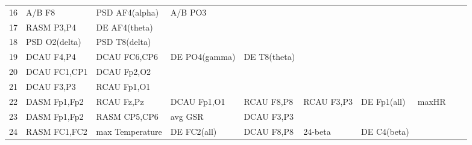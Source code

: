 \begin{landscape}
\begin{table}[]
\begin{tabular}{l|llllllll}
16       & A/B F8                & PSD AF4(alpha)        & A/B PO3              &                         &                         &                      &                      &                       &                       &                    \\
17       & RASM P3,P4            & DE AF4(theta)         &                      &                         &                         &                      &                      &                       &                       &                    \\
18       & PSD O2(delta)         & PSD T8(delta)         &                      &                         &                         &                      &                      &                       &                       &                    \\
19       & DCAU F4,P4            & DCAU FC6,CP6          & DE PO4(gamma)        & DE T8(theta)            &                         &                      &                      &                       &                       &                    \\
20       & DCAU FC1,CP1          & DCAU Fp2,O2           &                      &                         &                         &                      &                      &                       &                       &                    \\
21       & DCAU F3,P3            & RCAU Fp1,O1           &                      &                         &                         &                      &                      &                       &                       &                    \\
22       & DASM Fp1,Fp2          & RCAU Fz,Pz            & DCAU Fp1,O1          & RCAU F8,P8              & RCAU F3,P3              & DE Fp1(all)          & maxHR                &                       &                       &                    \\
23       & DASM Fp1,Fp2          & RASM CP5,CP6          & avg GSR              & DCAU F3,P3              &                         &                      &                      &                       &                       &                    \\
24       & RASM FC1,FC2          & max Temperature       & DE FC2(all)          & DCAU F8,P8              & 24-beta                 & DE C4(beta)          &                      &                       &                       &                    \\

\end{tabular}
\end{table}
\end{landscape}
